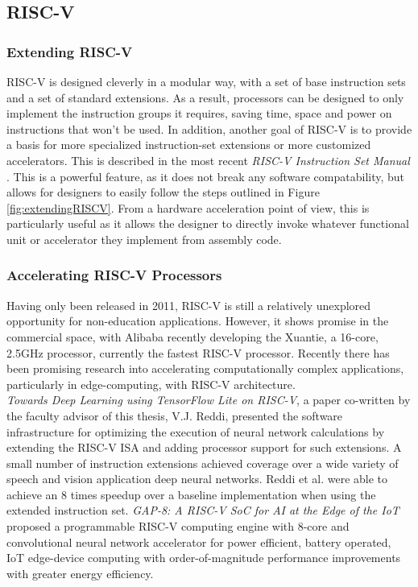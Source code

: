 


    \subsection{RISC-V}
    \subsubsection{Extending RISC-V}
    RISC-V is designed cleverly in a modular way, with a set of base instruction sets and a set of standard extensions. As a result, processors can be designed to only implement the instruction groups it requires, saving time, space and power on instructions that won't be used. In addition, another goal of RISC-V is to provide a basis for more specialized instruction-set extensions or more customized accelerators. This is described in the most recent \textit{RISC-V Instruction Set Manual} \cite{Waterman2019}. This is a powerful feature, as it does not break any software compatability, but allows for designers to easily follow the steps outlined in Figure \ref{fig:extendingRISCV}. From a \gls{hardware acceleration} point of view, this is particularly useful as it allows the designer to directly invoke whatever functional unit or accelerator they implement from assembly code.
    

    \subsubsection{Accelerating RISC-V Processors}
    Having only been released in 2011, RISC-V is still a relatively unexplored opportunity for non-education applications. However, it shows promise in the commercial space, with Alibaba recently developing the Xuantie, a 16-core, 2.5GHz processor, currently the fastest RISC-V processor. Recently there has been promising research into accelerating computationally complex applications, particularly in edge-computing, with RISC-V architecture. \\
    \textit{Towards Deep Learning using TensorFlow Lite on RISC-V}, a paper co-written by the faculty advisor of this thesis, V.J. Reddi, presented the software infrastructure for optimizing the execution of neural network calculations by extending the RISC-V ISA and adding processor support for such extensions. A small number of instruction extensions achieved coverage over a wide variety of speech and vision application deep neural networks. Reddi et al. were able to achieve an 8 times speedup over a baseline implementation when using the extended instruction set.
    \textit{GAP-8: A RISC-V SoC for AI at the Edge of the IoT} proposed a programmable RISC-V computing engine with 8-core and convolutional neural network accelerator for power efficient, battery operated, IoT edge-device computing with order-of-magnitude performance improvements with greater energy efficiency. \\

